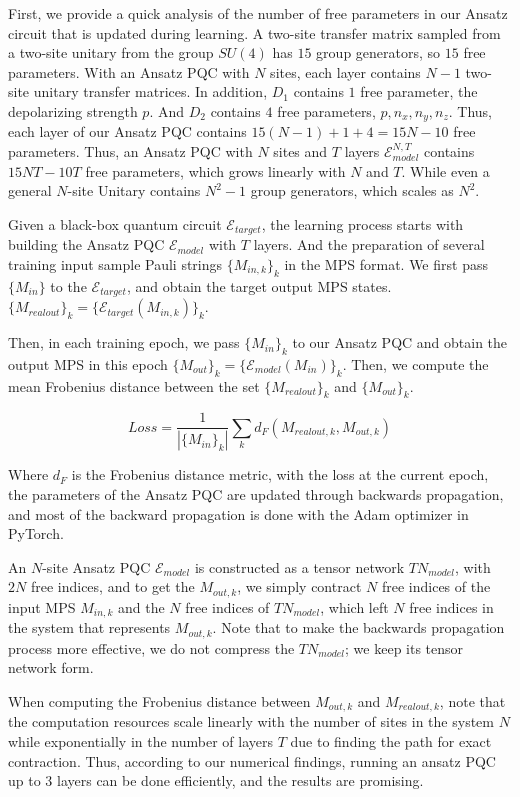 \documentclass[%
 reprint,
superscriptaddress,
 amsmath,amssymb,
 aps,
]{revtex4-2}
\newcommand{\E}{\mathcal{E}}
\begin{document}
First, we provide a quick analysis of the number of free parameters in our Ansatz circuit that is updated during learning. A two-site transfer matrix sampled from a two-site unitary from the group $SU(4)$ has $15$ group generators, so $15$ free parameters. With an Ansatz PQC with $N$ sites, each layer contains $N-1$ two-site unitary transfer matrices. In addition, $D_1$ contains $1$ free parameter, the depolarizing strength $p$. And $D_2$ contains $4$ free parameters, $p, n_x, n_y, n_z$. Thus, each layer of our Ansatz PQC contains $15(N-1)+1+4=15N-10$ free parameters. Thus, an Ansatz PQC with $N$ sites and $T$ layers $\E_{model}^{N, T}$ contains $15NT-10T$ free parameters, which grows linearly with $N$ and $T$. While even a general $N$-site Unitary contains $N^2-1$ group generators, which scales as $N^2$.

Given a black-box quantum circuit $\E_{target}$, the learning process starts with building the Ansatz PQC $\E_{model}$ with $T$ layers. And the preparation of several training input sample Pauli strings $\{M_{in, k}\}_k$ in the MPS format. We first pass $\{M_{in}\}$ to the $\E_{target}$, and obtain the target output MPS states. $\{M_{realout}\}_k = \{\E_{target}(M_{in, k})\}_k$. 

Then, in each training epoch, we pass $\{M_{in}\}_k$ to our Ansatz PQC and obtain the output MPS in this epoch $\{M_{out}\}_k = \{\E_{model}(M_{in})\}_k$. Then, we compute the mean Frobenius distance between the set $\{M_{realout}\}_k$ and $\{M_{out}\}_k$.

\begin{equation}
    Loss = \frac{1}{|\{M_{in}\}_k|}\sum_k d_F\left(M_{realout, k}, M_{out, k}\right)
\end{equation}

Where $d_F$ is the Frobenius distance metric, with the loss at the current epoch, the parameters of the Ansatz PQC are updated through backwards propagation, and most of the backward propagation is done with the Adam optimizer in PyTorch.

An $N$-site Ansatz PQC $\E_{model}$ is constructed as a tensor network $TN_{model}$, with $2N$ free indices, and to get the $M_{out, k}$, we simply contract $N$ free indices of the input MPS $M_{in, k}$ and the $N$ free indices of $TN_{model}$, which left $N$ free indices in the system that represents $M_{out, k}$. Note that to make the backwards propagation process more effective, we do not compress the $TN_{model}$; we keep its tensor network form. 

When computing the Frobenius distance between $M_{out, k}$ and $M_{realout, k}$, note that the computation resources scale linearly with the number of sites in the system $N$ while exponentially in the number of layers $T$ due to finding the path for exact contraction. Thus, according to our numerical findings, running an ansatz PQC up to 3 layers can be done efficiently, and the results are promising.
\end{document}
